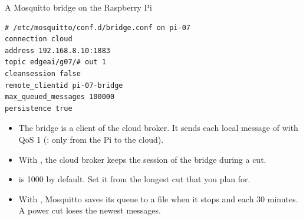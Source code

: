\begin{frame}[fragile]{A Mosquitto bridge on the Raspberry Pi}
\begin{lstlisting}[style=shell]
# /etc/mosquitto/conf.d/bridge.conf on pi-07
connection cloud
address 192.168.8.10:1883
topic edgeai/g07/# out 1
cleansession false
remote_clientid pi-07-bridge
max_queued_messages 100000
persistence true
\end{lstlisting}
  \small
  \begin{itemize}
    \item The bridge is a client of the cloud broker. It sends each local
          message of  with QoS 1 (: only
          from the Pi to the cloud).
    \item With , the cloud broker keeps the
          session of the bridge during a cut.
    \item {} is 1000 by default. Set it from the
          longest cut that you plan for.
    \item With , Mosquitto saves its queue to a file
          when it stops and each 30 minutes. A power cut loses the newest
          messages.
  \end{itemize}
\end{frame}

